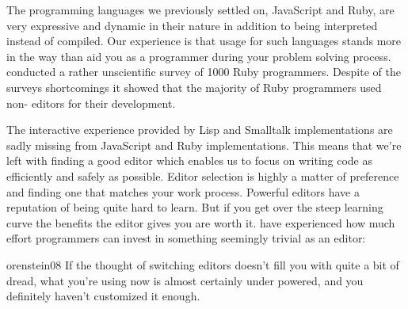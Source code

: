 The programming languages we previously settled on, JavaScript and Ruby,
are very expressive and dynamic in their nature in addition to being
interpreted instead of compiled. Our experience is that  usage for
such languages stands more in the way than aid you as a programmer during
your problem solving process.
\citet{bray07} conducted a rather unscientific survey of 1000 Ruby
programmers. Despite of the surveys shortcomings it showed that
the majority of Ruby programmers used non- editors for their
development.

The interactive experience provided by Lisp and Smalltalk implementations are
sadly missing%
from JavaScript and Ruby implementations. This means that we're left with
finding a good editor which enables us to focus on writing code as efficiently
and safely as possible. Editor selection is highly a matter of preference and
finding one that matches your work process. Powerful editors have a
reputation of being quite hard to learn. But if you get over the steep
learning curve the benefits the editor gives you are worth it.
\citeauthor{orenstein08} have experienced how much effort programmers can
invest in something seemingly trivial as an editor:

\begin{citequote}{orenstein08}
  If the thought of switching editors doesn't fill you with quite a bit of
  dread, what you're using now is almost certainly under powered, and you
  definitely haven't customized it enough.
\end{citequote}


